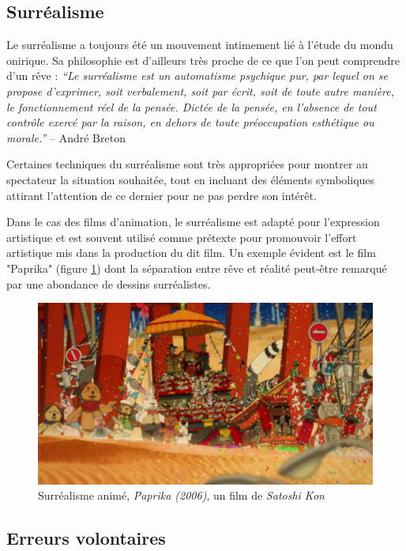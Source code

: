 \documentclass[../main.tex]{subfile}
\begin{document}
\subsection{Surréalisme}

Le surréalisme a toujours été un mouvement intimement lié à l'étude du mondu
onirique. Sa philosophie est d'ailleurs très proche de ce que l'on peut
comprendre d'un rêve : \textit{``Le surréalisme est un automatisme psychique pur,
par lequel on se propose d'exprimer, soit verbalement, soit par écrit, soit de
toute autre manière, le fonctionnement réel de la pensée. Dictée de la pensée,
en l'absence de tout contrôle exercé par la raison, en dehors de toute
préoccupation esthétique ou morale.''} -- André Breton

Certaines techniques du surréalisme sont très appropriées pour montrer au
spectateur la situation souhaitée, tout en incluant des éléments symboliques
attirant l'attention de ce dernier pour ne pas perdre son intérêt.

Dans le cas des films d'animation, le surréalisme est adapté pour l'expression
artistique et est souvent utilisé comme prétexte pour promouvoir l'effort
artistique mis dans la production du dit film. Un exemple évident est le film
"Paprika" (figure \ref{fig:images_paprika}) dont la séparation entre rêve et
réalité peut-être remarqué par une abondance de dessins surréalistes.

\begin{figure}
    \centering
    \includegraphics[width=\linewidth]{images/paprika}
    \caption{Surréalisme animé, \textit{Paprika (2006)}, un film de
             \textit{Satoshi Kon}}
    \label{fig:images_paprika}
\end{figure}

\subsection{Erreurs volontaires}
\end{document}
